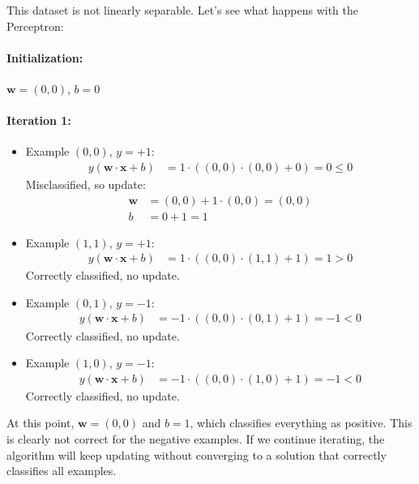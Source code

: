 \documentclass{article}
\begin{document}
This dataset is not linearly separable. Let's see what happens with the Perceptron:

\paragraph{Initialization:} $\mathbf{w} = (0,0)$, $b = 0$

\paragraph{Iteration 1:}
\begin{itemize}
    \item Example $(0,0)$, $y = +1$:
    \begin{align}
        y(\mathbf{w} \cdot \mathbf{x} + b) &= 1 \cdot ((0,0) \cdot (0,0) + 0) = 0 \leq 0
    \end{align}
    Misclassified, so update:
    \begin{align}
        \mathbf{w} &= (0,0) + 1 \cdot (0,0) = (0,0)\\
        b &= 0 + 1 = 1
    \end{align}
    
    \item Example $(1,1)$, $y = +1$:
    \begin{align}
        y(\mathbf{w} \cdot \mathbf{x} + b) &= 1 \cdot ((0,0) \cdot (1,1) + 1) = 1 > 0
    \end{align}
    Correctly classified, no update.
    
    \item Example $(0,1)$, $y = -1$:
    \begin{align}
        y(\mathbf{w} \cdot \mathbf{x} + b) &= -1 \cdot ((0,0) \cdot (0,1) + 1) = -1 < 0
    \end{align}
    Correctly classified, no update.
    
    \item Example $(1,0)$, $y = -1$:
    \begin{align}
        y(\mathbf{w} \cdot \mathbf{x} + b) &= -1 \cdot ((0,0) \cdot (1,0) + 1) = -1 < 0
    \end{align}
    Correctly classified, no update.
\end{itemize}

At this point, $\mathbf{w} = (0,0)$ and $b = 1$, which classifies everything as positive. This is clearly not correct for the negative examples. If we continue iterating, the algorithm will keep updating without converging to a solution that correctly classifies all examples.
\end{document}
